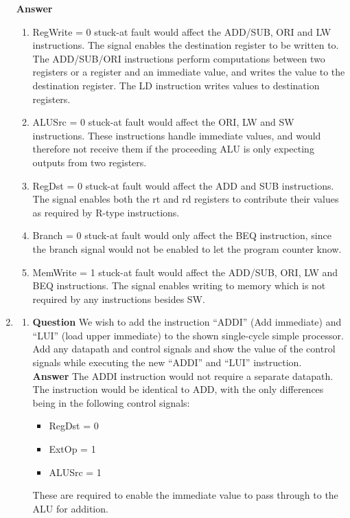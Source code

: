 \documentclass[paper=usletter, fontsize=12pt]{article}
\begin{document}
\begin{enumerate}
        \textbf{Answer}
        \begin{enumerate}

            \item RegWrite = 0 stuck-at fault would affect the ADD/SUB, ORI and LW instructions. The signal enables the destination register to be written to. The ADD/SUB/ORI instructions perform computations between two registers or a register and an immediate value, and writes the value to the destination register. The LD instruction writes values to destination registers. \\

            \item ALUSrc = 0 stuck-at fault would affect the ORI, LW and SW instructions. These instructions handle immediate values, and would therefore not receive them if the proceeding ALU is only expecting outputs from two registers. \\

            \item RegDst = 0 stuck-at fault would affect the ADD and SUB instructions. The signal enables both the rt and rd registers to contribute their values as required by R-type instructions. \\

            \item Branch = 0 stuck-at fault would only affect the BEQ instruction, since the branch signal would not be enabled to let the program counter know. \\

            \item MemWrite = 1 stuck-at fault would affect the ADD/SUB, ORI, LW and BEQ instructions. The signal enables writing to memory which is not required by any instructions besides SW.

        \end{enumerate}

        \item
        \begin{enumerate}

            \item \textbf{Question}
            We wish to add the instruction “ADDI” (Add immediate) and “LUI” (load upper immediate) to the shown single-cycle simple processor. Add any datapath and control signals and show the value of the control signals while executing the new “ADDI” and “LUI” instruction. \\

            \textbf{Answer}
            The ADDI instruction would not require a separate datapath. The instruction would be identical to ADD, with the only differences being in the following control signals:
            \begin{itemize}
                \item RegDst = 0
                \item ExtOp = 1
                \item ALUSrc = 1
            \end{itemize}
            These are required to enable the immediate value to pass through to the ALU for addition. \\


\end{enumerate}
\end{enumerate}
\end{document}
